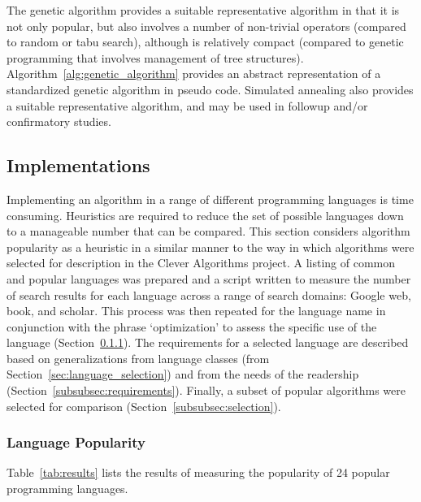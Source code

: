 \documentclass[a4paper, 11pt]{article}
\begin{document}
The genetic algorithm provides a suitable representative algorithm in that it is not only popular, but also involves a number of non-trivial operators (compared to random or tabu search), although is relatively compact (compared to genetic programming that involves management of tree structures). Algorithm~\ref{alg:genetic_algorithm} provides an abstract representation of a standardized genetic algorithm in pseudo code. Simulated annealing also provides a suitable representative algorithm, and may be used in followup and/or confirmatory studies. 


% 
% 
\subsection{Implementations}
Implementing an algorithm in a range of different programming languages is time consuming. Heuristics are required to reduce the set of possible languages down to a manageable number that can be compared.
This section considers algorithm popularity as a heuristic in a similar manner to the way in which algorithms were selected for description in the Clever Algorithms project. A listing of common and popular languages was prepared and a script written to measure the number of search results for each language across a range of search domains: Google web, book, and scholar. This process was then repeated for the language name in conjunction with the phrase `optimization' to assess the specific use of the language (Section~\ref{subsubsec:popularity}). The requirements for a selected language are described based on generalizations from language classes (from Section~\ref{sec:language_selection}) and from the needs of the readership (Section~\ref{subsubsec:requirements}). Finally, a subset of popular algorithms were selected for comparison (Section~\ref{subsubsec:selection}).

% 
% 
\subsubsection{Language Popularity}
\label{subsubsec:popularity}
Table~\ref{tab:results} lists the results of measuring the popularity of 24 popular programming languages. 
\end{document}
